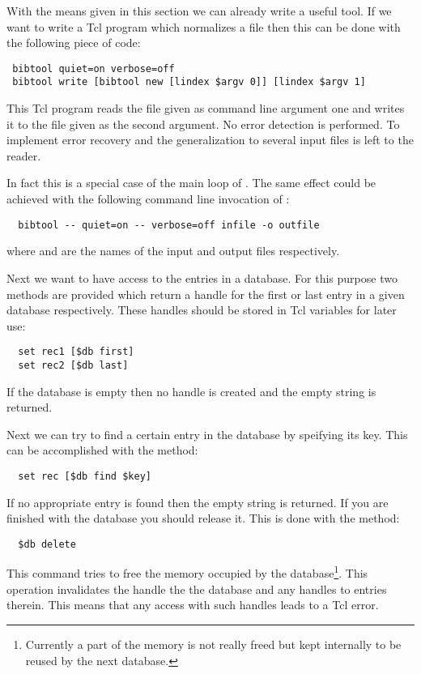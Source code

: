 With the means given in this section we can already write a useful
tool. If we want to write a Tcl program which normalizes a \BibTeX{}
file then this can be done with the following piece of code:
\begin{verbatim}
 bibtool quiet=on verbose=off
 bibtool write [bibtool new [lindex $argv 0]] [lindex $argv 1]
\end{verbatim}%
This Tcl program reads the \BibTeX{} file given as command line
argument one and writes it to the file given as the second
argument. No error detection is performed. To implement error recovery
and the generalization to several input files is left to the reader.

In fact this is a special case of the main loop of \BibTool. The same
effect could be achieved with the following command line invocation of
\BibTool:
\begin{verbatim}
  bibtool -- quiet=on -- verbose=off infile -o outfile
\end{verbatim}
where  and  are the names of the input and
output files respectively.

Next we want to have access to the entries in a database. For this
purpose two methods are provided which return a handle for the first
or last entry in a given database respectively. These handles should
be stored in Tcl variables for later use:
\begin{verbatim}
  set rec1 [$db first]
  set rec2 [$db last]
\end{verbatim}
If the database is empty then no handle is created and the empty
string is returned.

Next we can try to find a certain entry in the database by speifying
its key. This can be accomplished with the  method:
\begin{verbatim}
  set rec [$db find $key]
\end{verbatim}
If no appropriate entry is found then the empty string is returned.
If you are finished with the database you should release it. This is
done with the  method:
\begin{verbatim}
  $db delete
\end{verbatim}%
This command tries to free the memory occupied by the
database\footnote{Currently a part of the memory is not really freed
  but kept internally to be reused by the next database.}. This
operation invalidates the handle the the database and any handles to
entries therein. This means that any access with such handles leads to
a Tcl error.

